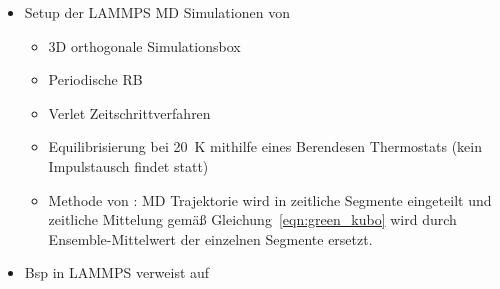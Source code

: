 \documentclass[a4paper, 10pt, 
               numbers=noenddot, toc=graduated,
               headsepline=true, footsepline=true,
               twoside=false, titlepage=true, 
               bibliography=totoc]{scrartcl}
\newcommand{\refeqn}[1]  {Gleichung~\ref{#1}}
\begin{document}
\begin{itemize}
    		 \item Setup der LAMMPS MD Simulationen von \cite{Kirova2015,Tenney2010} 
		 		\begin{itemize}
		 			\item 3D orthogonale Simulationsbox
		 			\item Periodische RB
		 			\item Verlet Zeitschrittverfahren
		 			\item Equilibrisierung bei \SI{20}{K} mithilfe eines Berendesen Thermostats (kein Impulstausch findet statt)
		 			\item Methode von \cite{Kirova2015}: MD Trajektorie wird in zeitliche Segmente eingeteilt und zeitliche Mittelung gemäß \refeqn{eqn:green_kubo} wird durch Ensemble-Mittelwert der einzelnen Segmente ersetzt.
		 		\end{itemize}
			 	
		 	\item Bsp in LAMMPS verweist auf \cite{Daivis1994}
		\end{itemize}
\end{document}
